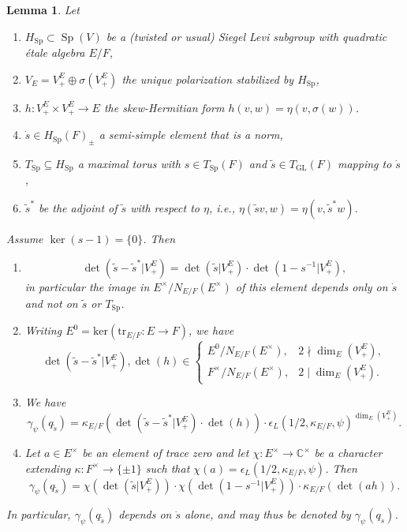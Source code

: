 \documentclass{article}
\def\C{\mathbb{C}}
\DeclareMathOperator{\Sp}{Sp}
\DeclareMathOperator{\GL}{GL}
\newtheorem{lem}[thm]{Lemma}
\theoremstyle{definition}
\numberwithin{equation}{subsection}
\renewcommand{\-}{\hyp{}}
\begin{document}
\begin{lem} \label{lem:qsd-tsl}
	Let 
	\begin{enumerate}
		\item $H_{\Sp} \subset \Sp(V)$ be a (twisted or usual) Siegel Levi subgroup with quadratic \'etale algebra $E/F$,
		\item $V_E = V_+^E \oplus \sigma(V_+^E)$ the unique polarization stabilized by $H_{\Sp}$,
		\item $h : V_+^E \times V_+^E \to E$ the skew-Hermitian form $h(v,w)=\eta(v,\sigma(w))$.
		\item $\dot s \in H_{\Sp}(F)_\pm$ a semi-simple element that is a norm,
\item $T_{\Sp} \subseteq H_{\Sp}$ a maximal torus with $s \in T_{\Sp}(F)$ and $\tilde s \in T_{\GL}(F)$ mapping to $\dot s$,
		\item $\tilde s^*$ be the adjoint of $\tilde s$ with respect to $\eta$, i.e., $\eta(\tilde sv,w)=\eta(v,\tilde s^*w)$.
	\end{enumerate}
	Assume $\ker(s-1)=\{0\}$. Then
	\begin{enumerate}
		\item 
		\[ \det(\tilde s-\tilde s^*|V_+^E) = \det(\tilde s|V_+^E) \cdot \det(1-s^{-1}|V_+^E), \]
		in particular the image in $E^\times/N_{E/F}(E^\times)$ of this element depends only on $\dot s$ and not on $\tilde s$ or $T_{\Sp}$.
	\item Writing $E^0=\mathrm{ker}(\mathrm{tr}_{E/F} : E \to F)$, we have
	\[ \det(\tilde s-\tilde s^*|V_+^E), \det(h) \in \begin{cases}
		E^0/N_{E/F}(E^\times),&2\nmid\dim_E(V_+^E),\\
		F^\times/N_{E/F}(E^\times),&2\mid \dim_E(V_+^E).
	\end{cases}\]
	\item We have 
	\[ \gamma_\psi(q_{\tilde s})=\kappa_{E/F}(\det(\tilde s-\tilde s^*|V_+^E) \cdot \det(h)) \cdot \epsilon_L(1/2,\kappa_{E/F},\psi)^{\dim_E(V_+^E)}.  \]
	\item Let $a \in E^\times$ be an element of trace zero and let $\chi : E^\times \to \C^\times$ be a character extending $\kappa : F^\times \to \{\pm1\}$ such that $\chi(a)=\epsilon_L(1/2,\kappa_{E/F},\psi)$. Then \[ \gamma_\psi(q_{\tilde s}) = \chi(\det(\tilde s|V_+^E))\cdot \chi(\det(1-s^{-1}|V_+^E))\cdot \kappa_{E/F}(\det(ah)).\]
	\end{enumerate}
	In particular, $\gamma_\psi(q_{\tilde s})$ depends on $\dot s$ alone, and may thus be denoted by $\gamma_\psi(q_{\dot s})$.
\end{lem}
\end{document}
